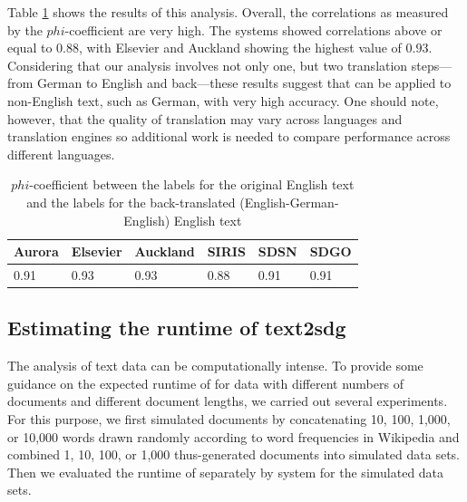 Table \ref{tab:my-table_corr} shows the results of this analysis. Overall, the correlations as measured by the $phi$-coefficient are very high. The systems showed correlations above or equal to $0.88$, with Elsevier and Auckland showing the highest value of $0.93$. Considering that our analysis involves not only one, but two translation steps---from German to English and back---these results suggest that  can be applied to non-English text, such as German, with very high accuracy. One should note, however, that the quality of translation may vary across languages and translation engines so additional work is needed to compare performance across different languages. 

\begin{table}[h]
\centering
\begin{tabular}{@{}llllll@{}}
\toprule
Aurora & Elsevier & Auckland & SIRIS & SDSN & SDGO \\ \midrule
0.91 & 0.93 & 0.93 & 0.88 & 0.91 & 0.91 \\
\bottomrule
\end{tabular}%
\caption{$phi$-coefficient between the labels for the original English text and the labels for the back-translated (English-German-English) English text}
\label{tab:my-table_corr}
\end{table}


 \subsection{Estimating the runtime of text2sdg}

 The analysis of text data can be computationally intense. To provide some guidance on the expected runtime of  for data with different numbers of documents and different document lengths, we carried out several experiments. For this purpose, we first simulated documents by concatenating 10, 100, 1,000, or 10,000 words drawn randomly according to word frequencies in Wikipedia and combined 1, 10, 100, or 1,000 thus-generated documents into simulated data sets. Then we evaluated the runtime of  separately by system for the simulated data sets. 
 
